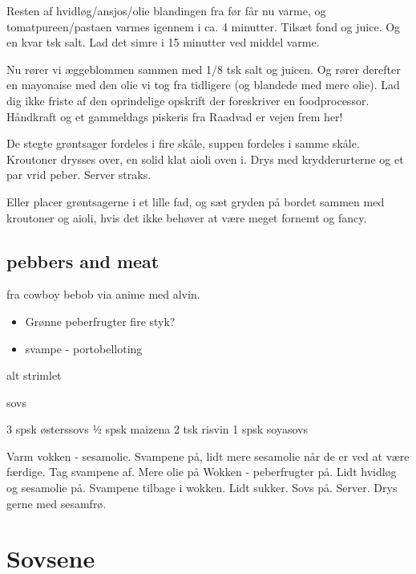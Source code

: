 \documentclass[
]{book}
\providecommand{\tightlist}{%
  \setlength{\itemsep}{0pt}\setlength{\parskip}{0pt}}
\begin{document}
Resten af hvidløg/ansjos/olie blandingen fra før får nu varme, og tomatpureen/pastaen
varmes igennem i ca. 4 minutter. Tilsæt fond og juice. Og en kvar tsk salt.
Lad det simre i 15 minutter ved middel varme.

Nu rører vi æggeblommen sammen med 1/8 tsk salt og juicen. Og rører derefter
en mayonaise med den olie vi tog fra tidligere (og blandede med mere olie).
Lad dig ikke friste af den oprindelige opskrift der foreskriver en foodprocessor.
Håndkraft og et gammeldags piskeris fra Raadvad er vejen frem her!

De stegte grøntsager fordeles i fire skåle,
suppen fordeles i samme skåle. Kroutoner drysses over, en solid klat aioli oven i.
Drys med krydderurterne og et par vrid peber. Server straks.

Eller placer grøntsagerne i et lille fad, og sæt gryden på bordet sammen med
kroutoner og aioli, hvis det ikke behøver at være meget fornemt og fancy.

\hypertarget{pebbers-and-meat}{%
\section{pebbers and meat}\label{pebbers-and-meat}}

fra cowboy bebob via anime med alvin.

\begin{itemize}
\tightlist
\item
  Grønne peberfrugter fire styk?
\item
  svampe - portobelloting
\end{itemize}

alt strimlet

sovs

3 spsk østerssovs
½ spsk maizena
2 tsk risvin
1 spsk soyasovs

Varm vokken - sesamolie. Svampene på, lidt mere sesamolie når de er ved at være
færdige. Tag svampene af. Mere olie på Wokken - peberfrugter på. Lidt hvidløg og
sesamolie på. Svampene tilbage i wokken. Lidt sukker. Sovs på. Server. Drys gerne
med sesamfrø.

\hypertarget{sovsene}{%
\chapter{Sovsene}\label{sovsene}}
\end{document}
